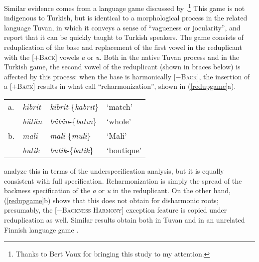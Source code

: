 Similar evidence comes from a language game discussed by \citet{Harrison2001}.\footnote{Thanks to Bert Vaux for bringing this study to my attention.} This game is not indigenous to Turkish, but is identical to a morphological process in the related language Tuvan, in which it conveys a sense of ``vagueness or jocularity'', and \citeauthor{Harrison2001} report that it can be quickly taught to Turkish speakers. The game consists of reduplication of the base and replacement of the first vowel in the reduplicant with the [$+$\textsc{Back}] vowels \emph{a} or \emph{u}. Both in the native Tuvan process and in the Turkish game, the second vowel of the reduplicant (shown in braces below) is affected by this process: when the base is harmonically [$-$\textsc{Back}], the insertion of a [$+$\textsc{Back}] results in what \citeauthor{Harrison2001} call ``reharmonization'', shown in  (\ref{redupgame}a).

\begin{example} \label{redupgame}
\begin{tabular}{l l l l}
a. & \emph{kibrit} & \emph{kibrit}-\{\emph{kabrıt}\} & `match'    \\
   & \emph{bütün}  & \emph{bütün}-\{\emph{batın}\}   & `whole'    \\
b. & \emph{mali}   & \emph{mali}-\{\emph{muli}\}     & `Mali'     \\
   & \emph{butik}  & \emph{butik}-\{\emph{batik}\}   & `boutique' \\
\end{tabular}
\end{example}

\noindent \citeauthor{Harrison2001} analyze this in terms of the \citeauthor{Clements1982} underspecification analysis, but it is equally consistent with full specification. Reharmonization is simply the spread of the backness specification of the \emph{a} or \emph{u} in the reduplicant. On the other hand, (\ref{redupgame}b) shows that this does not obtain for disharmonic roots; presumably, the [$-$\textsc{Backness Harmony}] exception feature is copied under reduplication as well. Similar results obtain both in Tuvan and in an unrelated Finnish language game \citep{Campbell1986}.

